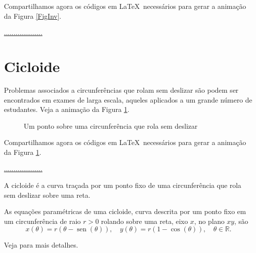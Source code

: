 \documentclass[10pt]{article}
\DeclareMathOperator{\sen}{sen} %
\theoremstyle{plain} %
\theoremstyle{definition} %
\theoremstyle{remark} %
\begin{document}
Compartilhamos agora os códigos em  \LaTeX\ necessários para gerar a animação da Figura \ref{FigInv}.




\href{.................}{....................}






\section{Cicloide}\label{SecCicloide}

Problemas associados a circunferências que rolam sem deslizar são podem ser encontrados em exames de larga escala, aqueles aplicados a um grande número de estudantes. Veja a animação da Figura \ref{Animacao1}.

\begin{figure}[!htp]
\centering
\begin{animateinline}[poster = last, controls]{25}
{
}
\end{animateinline}
\caption{Um ponto sobre uma circunferência que rola sem deslizar}
\label{Animacao1}
\end{figure}

Compartilhamos agora os códigos em  \LaTeX\ necessários para gerar a animação da Figura  \ref{Animacao1}.




\href{.................}{....................}




\begin{definition}
A cicloide é a curva traçada por um ponto fixo de uma circunferência que rola sem deslizar sobre uma reta. 
\end{definition}

\begin{theorem}
As equações paramétricas de uma cicloide, curva descrita por um ponto fixo em um circunferência de raio $r>0$ rolando sobre uma reta, eixo $x$, no plano $xy$, são
\[
x(\theta)=r(\theta-\sen(\theta)),\quad y(\theta)=r(1-\cos(\theta)),\quad \theta\in\mathbb{R}.
\]
\end{theorem}
Veja \cite{ASN} para mais detalhes.
\end{document}
